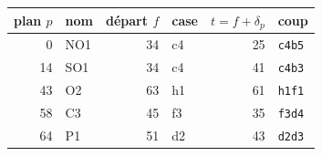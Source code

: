 \begin{tabular}{rlrlrl}\toprule plan $p$ & nom & départ $f$ & case & $t = f + \delta_p$ & coup\\\midrule
0 & NO1 & 34 & c4 & 25 & \texttt{c4b5}\\
14 & SO1 & 34 & c4 & 41 & \texttt{c4b3}\\
43 & O2 & 63 & h1 & 61 & \texttt{h1f1}\\
58 & C3 & 45 & f3 & 35 & \texttt{f3d4}\\
64 & P1 & 51 & d2 & 43 & \texttt{d2d3}\\\bottomrule\end{tabular}
